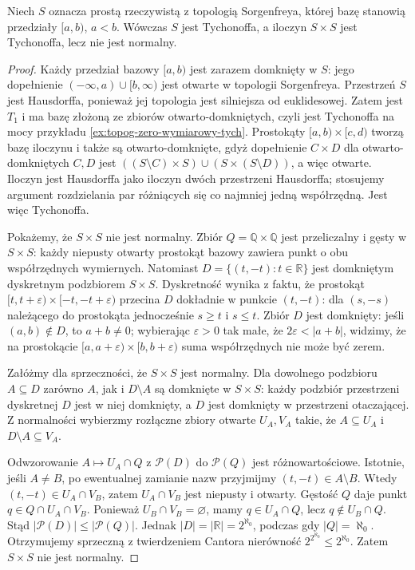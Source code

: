 \begin{twierdzenie}
\label{thm:topog-sorgenfrey-plane}
Niech $S$ oznacza prostą rzeczywistą z topologią Sorgenfreya,
której bazę stanowią przedziały $[a,b)$, $a<b$.
Wówczas $S$ jest Tychonoffa, a iloczyn $S\times S$
jest Tychonoffa, lecz nie jest normalny.
\end{twierdzenie}
\begin{proof}
Każdy przedział bazowy $[a,b)$ jest zarazem domknięty w $S$:
jego dopełnienie $(-\infty,a)\cup[b,\infty)$ jest otwarte
w topologii Sorgenfreya. Przestrzeń $S$ jest Hausdorffa,
ponieważ jej topologia jest silniejsza od euklidesowej.
Zatem jest $T_1$ i ma bazę złożoną ze zbiorów
otwarto-domkniętych, czyli jest Tychonoffa
na mocy przykładu \ref{ex:topog-zero-wymiarowy-tych}.
Prostokąty $[a,b)\times[c,d)$ tworzą bazę iloczynu
i także są otwarto-domknięte, gdyż dopełnienie
$C\times D$ dla otwarto-domkniętych $C,D$ jest
$((S\setminus C)\times S)\cup(S\times(S\setminus D))$,
a więc otwarte. Iloczyn jest Hausdorffa jako iloczyn
dwóch przestrzeni Hausdorffa; stosujemy argument
rozdzielania par różniących się co najmniej jedną współrzędną.
Jest więc Tychonoffa.

Pokażemy, że $S\times S$ nie jest normalny.
Zbiór $Q=\mathbb Q\times\mathbb Q$ jest przeliczalny
i gęsty w $S\times S$: każdy niepusty otwarty
prostokąt bazowy zawiera punkt o obu współrzędnych
wymiernych. Natomiast
$D=\{(t,-t):t\in\mathbb R\}$ jest domkniętym
dyskretnym podzbiorem $S\times S$.
Dyskretność wynika z faktu, że prostokąt
$[t,t+\varepsilon)\times[-t,-t+\varepsilon)$ przecina
$D$ dokładnie w punkcie $(t,-t)$: dla $(s,-s)$
należącego do prostokąta jednocześnie $s\ge t$
i $s\le t$. Zbiór $D$ jest domknięty: jeśli
$(a,b)\notin D$, to $a+b\ne0$; wybierając
$\varepsilon>0$ tak małe, że $2\varepsilon<|a+b|$,
widzimy, że na prostokącie
$[a,a+\varepsilon)\times[b,b+\varepsilon)$
suma współrzędnych nie może być zerem.

Załóżmy dla sprzeczności, że $S\times S$ jest normalny.
Dla dowolnego podzbioru $A\subseteq D$ zarówno $A$,
jak i $D\setminus A$ są domknięte w $S\times S$:
każdy podzbiór przestrzeni dyskretnej $D$ jest w niej
domknięty, a $D$ jest domknięty w przestrzeni otaczającej.
Z normalności wybierzmy rozłączne zbiory otwarte
$U_A,V_A$ takie, że $A\subseteq U_A$
i $D\setminus A\subseteq V_A$.

Odwzorowanie $A\mapsto U_A\cap Q$ z $\mathcal P(D)$
do $\mathcal P(Q)$ jest różnowartościowe.
Istotnie, jeśli $A\ne B$, po ewentualnej zamianie
nazw przyjmijmy $(t,-t)\in A\setminus B$.
Wtedy $(t,-t)\in U_A\cap V_B$, zatem
$U_A\cap V_B$ jest niepusty i otwarty.
Gęstość $Q$ daje punkt
$q\in Q\cap U_A\cap V_B$. Ponieważ $U_B\cap V_B=\varnothing$,
mamy $q\in U_A\cap Q$, lecz $q\notin U_B\cap Q$.
Stąd $|\mathcal P(D)|\le|\mathcal P(Q)|$.
Jednak $|D|=|\mathbb R|=2^{\aleph_0}$, podczas gdy
$|Q|=\aleph_0$. Otrzymujemy sprzeczną z twierdzeniem Cantora
nierówność $2^{2^{\aleph_0}}\le2^{\aleph_0}$.
Zatem $S\times S$ nie jest normalny.
\end{proof}

